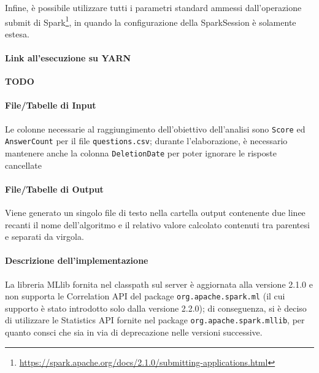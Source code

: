   Infine, è possibile utilizzare tutti i parametri standard ammessi dall'operazione submit di Spark\footnote{\url{https://spark.apache.org/docs/2.1.0/submitting-applications.html}},
  in quando la configurazione della SparkSession è solamente estesa.

  \paragraph{Link all'esecuzione su YARN}\label{par:job3:yarn}

  \textbf{TODO}

  \paragraph{File/Tabelle di Input}\label{par:job3:input}

  Le colonne necessarie al raggiungimento dell'obiettivo dell'analisi sono \texttt{Score} ed \texttt{AnswerCount} per il file \texttt{questions.csv};
  durante l'elaborazione, è necessario mantenere anche la colonna \texttt{DeletionDate} per poter ignorare le risposte cancellate

  \paragraph{File/Tabelle di Output}\label{par:job3:output}

  Viene generato un singolo file di testo nella cartella output contenente due linee recanti il nome dell'algoritmo e il relativo valore calcolato contenuti tra parentesi e separati da virgola.

  \paragraph{Descrizione dell'implementazione}\label{par:job3:implementation}

  La libreria MLlib fornita nel classpath sul server è aggiornata alla versione 2.1.0 e non supporta le Correlation API del package \texttt{org.apache.spark.ml} (il cui supporto è stato introdotto solo dalla versione 2.2.0);
  di conseguenza, si è deciso di utilizzare le Statistics API fornite nel package \texttt{org.apache.spark.mllib}, per quanto consci che sia in via di deprecazione nelle versioni successive.

